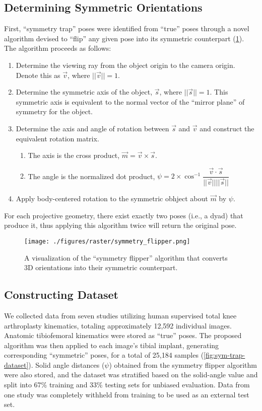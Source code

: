 \subsection{Determining Symmetric Orientations}
First, ``symmetry trap'' poses were identified from ``true'' poses through a novel algorithm devised to “flip” any given pose into its symmetric counterpart (\cref{fig:sym-flipper-alg}). The algorithm proceeds as follows:

\begin{enumerate}
  \item Determine the viewing ray from the object origin to the camera origin. Denote this as $\vec{v}$, where $||\vec{v}|| = 1$.
  \item Determine the symmetric axis of the object, $\vec{s}$, where $||\vec{s}|| = 1$. This symmetric axis is equivalent to the normal vector of the ``mirror plane'' of symmetry for the object.
  \item Determine the axis and angle of rotation between $\vec{s}$ and $\vec{v}$ and construct the equivalent rotation matrix.
        \begin{enumerate}
          \item The axis is the cross product, $\vec{m} = \vec{v} \times \vec{s}$.
          \item The angle is the normalized dot product, $\psi = 2 \times \cos^{-1}\dfrac{\vec{v} \cdot \vec{s}}{||\vec{v}||||\vec{s}||}$
        \end{enumerate}
  \item Apply body-centered rotation to the symmetric obhject about $\vec{m}$ by $\psi$.
\end{enumerate}

For each projective geometry, there exist exactly two poses (i.e., a dyad) that produce it, thus applying this algorithm twice will return the original pose.

\begin{figure}[h!]
  \centering
  \texttt{[image: ./figures/raster/symmetry\_flipper.png]}
  \caption{A visualization of the ``symmetry flipper'' algorithm that converts 3D orientations into their symmetric counterpart.}
  \label{fig:sym-flipper-alg}
\end{figure}

\subsection{Constructing Dataset}
We collected data from seven studies utilizing human supervised total knee arthroplasty kinematics, totaling approximately 12,592 individual images.
Anatomic tibiofemoral kinematics were stored as ``true'' poses.
The proposed algorithm was then applied to each image's tibial implant, generating corresponding “symmetric” poses, for a total of 25,184 samples (\cref{fig:sym-trap-dataset}).
Solid angle distances ($\psi$) obtained from the symmetry flipper algorithm were also stored, and the dataset was stratified based on the solid-angle value and split into 67\% training and 33\% testing sets for unbiased evaluation.
Data from one study \cite{okamotoVivoKneeKinematics2011} was completely withheld from training to be used as an external test set.

